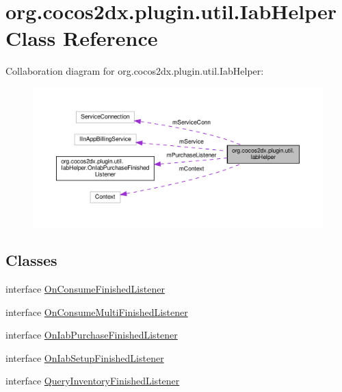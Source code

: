 \hypertarget{classorg_1_1cocos2dx_1_1plugin_1_1util_1_1IabHelper}{}\section{org.\+cocos2dx.\+plugin.\+util.\+Iab\+Helper Class Reference}
\label{classorg_1_1cocos2dx_1_1plugin_1_1util_1_1IabHelper}


Collaboration diagram for org.\+cocos2dx.\+plugin.\+util.\+Iab\+Helper\+:
\nopagebreak
\begin{figure}[H]
\begin{center}
\leavevmode
\includegraphics[width=350pt]{classorg_1_1cocos2dx_1_1plugin_1_1util_1_1IabHelper__coll__graph}
\end{center}
\end{figure}
\subsection*{Classes}
\begin{DoxyCompactItemize}
\item 
interface \hyperlink{interfaceorg_1_1cocos2dx_1_1plugin_1_1util_1_1IabHelper_1_1OnConsumeFinishedListener}{On\+Consume\+Finished\+Listener}
\item 
interface \hyperlink{interfaceorg_1_1cocos2dx_1_1plugin_1_1util_1_1IabHelper_1_1OnConsumeMultiFinishedListener}{On\+Consume\+Multi\+Finished\+Listener}
\item 
interface \hyperlink{interfaceorg_1_1cocos2dx_1_1plugin_1_1util_1_1IabHelper_1_1OnIabPurchaseFinishedListener}{On\+Iab\+Purchase\+Finished\+Listener}
\item 
interface \hyperlink{interfaceorg_1_1cocos2dx_1_1plugin_1_1util_1_1IabHelper_1_1OnIabSetupFinishedListener}{On\+Iab\+Setup\+Finished\+Listener}
\item 
interface \hyperlink{interfaceorg_1_1cocos2dx_1_1plugin_1_1util_1_1IabHelper_1_1QueryInventoryFinishedListener}{Query\+Inventory\+Finished\+Listener}
\end{DoxyCompactItemize}
